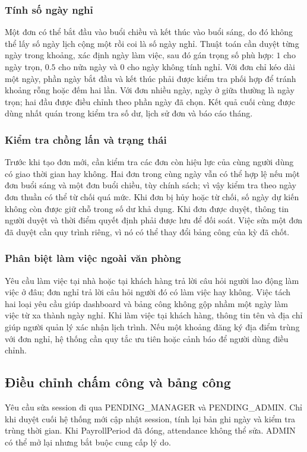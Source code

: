 \documentclass[12pt,a4paper,oneside]{report}
\begin{document}
\subsubsection{Tính số ngày nghỉ}
Một đơn có thể bắt đầu vào buổi chiều và kết thúc vào buổi sáng, do đó không thể lấy số ngày lịch cộng một rồi coi là số ngày nghỉ. Thuật toán cần duyệt từng ngày trong khoảng, xác định ngày làm việc, sau đó gán trọng số phù hợp: $1$ cho ngày trọn, $0.5$ cho nửa ngày và $0$ cho ngày không tính nghỉ. Với đơn chỉ kéo dài một ngày, phần ngày bắt đầu và kết thúc phải được kiểm tra phối hợp để tránh khoảng rỗng hoặc đếm hai lần. Với đơn nhiều ngày, ngày ở giữa thường là ngày trọn; hai đầu được điều chỉnh theo phần ngày đã chọn. Kết quả cuối cùng được dùng nhất quán trong kiểm tra số dư, lịch sử đơn và báo cáo tháng.

\subsubsection{Kiểm tra chồng lấn và trạng thái}
Trước khi tạo đơn mới, cần kiểm tra các đơn còn hiệu lực của cùng người dùng có giao thời gian hay không. Hai đơn trong cùng ngày vẫn có thể hợp lệ nếu một đơn buổi sáng và một đơn buổi chiều, tùy chính sách; vì vậy kiểm tra theo ngày đơn thuần có thể từ chối quá mức. Khi đơn bị hủy hoặc từ chối, số ngày dự kiến không còn được giữ chỗ trong số dư khả dụng. Khi đơn được duyệt, thông tin người duyệt và thời điểm quyết định phải được lưu để đối soát. Việc sửa một đơn đã duyệt cần quy trình riêng, vì nó có thể thay đổi bảng công của kỳ đã chốt.

\subsubsection{Phân biệt làm việc ngoài văn phòng}
Yêu cầu làm việc tại nhà hoặc tại khách hàng trả lời câu hỏi người lao động làm việc ở đâu; đơn nghỉ trả lời câu hỏi người đó có làm việc hay không. Việc tách hai loại yêu cầu giúp dashboard và bảng công không gộp nhầm một ngày làm việc từ xa thành ngày nghỉ. Khi làm việc tại khách hàng, thông tin tên và địa chỉ giúp người quản lý xác nhận lịch trình. Nếu một khoảng đăng ký địa điểm trùng với đơn nghỉ, hệ thống cần quy tắc ưu tiên hoặc cảnh báo để người dùng điều chỉnh.

\subsection{Điều chỉnh chấm công và bảng công}
Yêu cầu sửa session đi qua PENDING\_MANAGER và PENDING\_ADMIN. Chỉ khi duyệt cuối hệ thống mới cập nhật session, tính lại bản ghi ngày và kiểm tra trùng thời gian. Khi PayrollPeriod đã đóng, attendance không thể sửa. ADMIN có thể mở lại nhưng bắt buộc cung cấp lý do.
\end{document}
